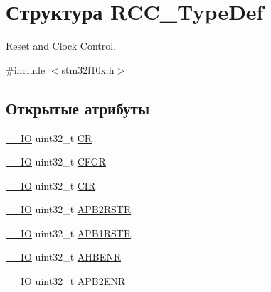 \hypertarget{struct_r_c_c___type_def}{}\section{Структура R\+C\+C\+\_\+\+Type\+Def}
\label{struct_r_c_c___type_def}


Reset and Clock Control.  




{\ttfamily \#include $<$stm32f10x.\+h$>$}

\subsection*{Открытые атрибуты}
\begin{DoxyCompactItemize}
\item 
\mbox{\hyperlink{group___c_m_s_i_s___c_m3__core__definitions_gaec43007d9998a0a0e01faede4133d6be}{\+\_\+\+\_\+\+IO}} uint32\+\_\+t \mbox{\hyperlink{struct_r_c_c___type_def_abcb9ff48b9afb990283fefad0554b5b3}{CR}}
\item 
\mbox{\hyperlink{group___c_m_s_i_s___c_m3__core__definitions_gaec43007d9998a0a0e01faede4133d6be}{\+\_\+\+\_\+\+IO}} uint32\+\_\+t \mbox{\hyperlink{struct_r_c_c___type_def_a0721b1b729c313211126709559fad371}{C\+F\+GR}}
\item 
\mbox{\hyperlink{group___c_m_s_i_s___c_m3__core__definitions_gaec43007d9998a0a0e01faede4133d6be}{\+\_\+\+\_\+\+IO}} uint32\+\_\+t \mbox{\hyperlink{struct_r_c_c___type_def_aeadf3a69dd5795db4638f71938704ff0}{C\+IR}}
\item 
\mbox{\hyperlink{group___c_m_s_i_s___c_m3__core__definitions_gaec43007d9998a0a0e01faede4133d6be}{\+\_\+\+\_\+\+IO}} uint32\+\_\+t \mbox{\hyperlink{struct_r_c_c___type_def_a4491ab20a44b70bf7abd247791676a59}{A\+P\+B2\+R\+S\+TR}}
\item 
\mbox{\hyperlink{group___c_m_s_i_s___c_m3__core__definitions_gaec43007d9998a0a0e01faede4133d6be}{\+\_\+\+\_\+\+IO}} uint32\+\_\+t \mbox{\hyperlink{struct_r_c_c___type_def_a600f4d6d592f43edb2fc653c5cba023a}{A\+P\+B1\+R\+S\+TR}}
\item 
\mbox{\hyperlink{group___c_m_s_i_s___c_m3__core__definitions_gaec43007d9998a0a0e01faede4133d6be}{\+\_\+\+\_\+\+IO}} uint32\+\_\+t \mbox{\hyperlink{struct_r_c_c___type_def_abaebc9204bbc1708356435a5a01e70eb}{A\+H\+B\+E\+NR}}
\item 
\mbox{\hyperlink{group___c_m_s_i_s___c_m3__core__definitions_gaec43007d9998a0a0e01faede4133d6be}{\+\_\+\+\_\+\+IO}} uint32\+\_\+t \mbox{\hyperlink{struct_r_c_c___type_def_a619b4c22f630a269dfd0c331f90f6868}{A\+P\+B2\+E\+NR}}

\end{DoxyCompactItemize}
